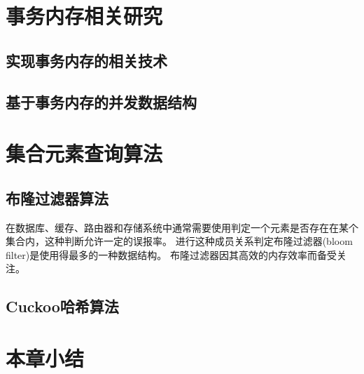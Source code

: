 \section{事务内存相关研究}

\subsection{实现事务内存的相关技术}
\subsection{基于事务内存的并发数据结构}

\section{集合元素查询算法}

\subsection{布隆过滤器算法}
在数据库、缓存、路由器和存储系统中通常需要使用判定一个元素是否存在在某个集合内，这种判断允许一定的误报率。
进行这种成员关系判定布隆过滤器(bloom filter)是使用得最多的一种数据结构\cite{bloom1970space}。
布隆过滤器因其高效的内存效率而备受关注。

\subsection{Cuckoo哈希算法}



\section{本章小结}


